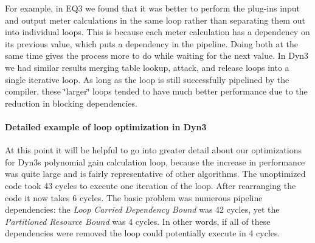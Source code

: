 For example, in E\+Q3 we found that it was better to perform the plug-\/in\textquotesingle{}s input and output meter calculations in the same loop rather than separating them out into individual loops. This is because each meter calculation has a dependency on its previous value, which puts a dependency in the pipeline. Doing both at the same time gives the process more to do while waiting for the next value. In Dyn3 we had similar results merging table lookup, attack, and release loops into a single iterative loop. As long as the loop is still successfully pipelined by the compiler, these \char`\"{}larger\char`\"{} loops tended to have much better performance due to the reduction in blocking dependencies.

\hypertarget{a00832_subsubsection__detailed_example_of_loop_optimization_in_dyn3_}{}\paragraph{Detailed example of loop optimization in Dyn3}\label{a00832_subsubsection__detailed_example_of_loop_optimization_in_dyn3_}
 At this point it will be helpful to go into greater detail about our optimizations for Dyn3\textquotesingle{}s polynomial gain calculation loop, because the increase in performance was quite large and is fairly representative of other algorithms. The unoptimized code took 43 cycles to execute one iteration of the loop. After rearranging the code it now takes 6 cycles. The basic problem was numerous pipeline dependencies\+: the {\itshape  Loop Carried Dependency Bound} was 42 cycles, yet the {\itshape  Partitioned Resource Bound} was 4 cycles. In other words, if all of these dependencies were removed the loop could potentially execute in 4 cycles.


